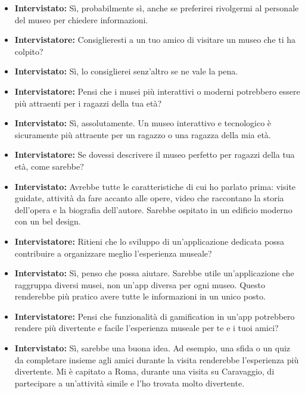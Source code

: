 \documentclass{article}
\begin{document}
\begin{itemize}
    \item \textbf{Intervistato:} Sì, probabilmente sì, anche se preferirei rivolgermi al personale del museo per chiedere informazioni.

    \item \textbf{Intervistatore:} Consiglieresti a un tuo amico di visitare un museo che ti ha colpito?

    \item \textbf{Intervistato:} Sì, lo consiglierei senz’altro se ne vale la pena.

    \item \textbf{Intervistatore:} Pensi che i musei più interattivi o moderni potrebbero essere più attraenti per i ragazzi della tua età?

    \item \textbf{Intervistato:} Sì, assolutamente. Un museo interattivo e tecnologico è sicuramente più attraente per un ragazzo o una ragazza della mia età.

    \item \textbf{Intervistatore:} Se dovessi descrivere il museo perfetto per ragazzi della tua età, come sarebbe?

    \item \textbf{Intervistato:} Avrebbe tutte le caratteristiche di cui ho parlato prima: visite guidate, attività da fare accanto alle opere, video che raccontano la storia dell’opera e la biografia dell’autore. Sarebbe ospitato in un edificio moderno con un bel design.

    \item \textbf{Intervistatore:} Ritieni che lo sviluppo di un’applicazione dedicata possa contribuire a organizzare meglio l’esperienza museale?

    \item \textbf{Intervistato:} Sì, penso che possa aiutare. Sarebbe utile un’applicazione che raggruppa diversi musei, non un’app diversa per ogni museo. Questo renderebbe più pratico avere tutte le informazioni in un unico posto.

    \item \textbf{Intervistatore:} Pensi che funzionalità di gamification in un’app potrebbero rendere più divertente e facile l’esperienza museale per te e i tuoi amici?

    \item \textbf{Intervistato:} Sì, sarebbe una buona idea. Ad esempio, una sfida o un quiz da completare insieme agli amici durante la visita renderebbe l’esperienza più divertente. Mi è capitato a Roma, durante una visita su Caravaggio, di partecipare a un’attività simile e l’ho trovata molto divertente.


\end{itemize}
\end{document}
